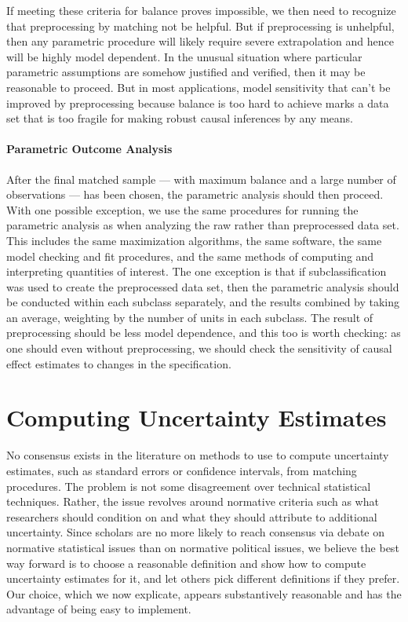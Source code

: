 \documentclass[11pt,titlepage]{article}
\begin{document}
If meeting these criteria for balance proves impossible, we then need
to recognize that preprocessing by matching not be helpful.  But if
preprocessing is unhelpful, then any parametric procedure will likely
require severe extrapolation and hence will be highly model dependent.
In the unusual situation where particular parametric assumptions are
somehow justified and verified, then it may be reasonable to proceed.
But in most applications, model sensitivity that can't be improved by
preprocessing because balance is too hard to achieve marks a data set
that is too fragile for making robust causal inferences by any means.

\paragraph{Parametric Outcome Analysis}  
After the final matched sample --- with maximum balance and a large
number of observations --- has been chosen, the parametric analysis
should then proceed.  With one possible exception, we use the same
procedures for running the parametric analysis as when analyzing the
raw rather than preprocessed data set.  This includes the same
maximization algorithms, the same software, the same model checking
and fit procedures, and the same methods of computing and interpreting
quantities of interest.  The one exception is that if
subclassification was used to create the preprocessed data set, then
the parametric analysis should be conducted within each subclass
separately, and the results combined by taking an average, weighting
by the number of units in each subclass.  The result of preprocessing
should be less model dependence, and this too is worth checking: as
one should even without preprocessing, we should check the sensitivity of causal
effect estimates to changes in the specification.

\section{Computing Uncertainty Estimates}

No consensus exists in the literature on methods to use to compute
uncertainty estimates, such as standard errors or confidence
intervals, from matching procedures.  The problem is not some
disagreement over technical statistical techniques.  Rather, the issue
revolves around normative criteria such as what researchers should
condition on and what they should attribute to additional uncertainty.
Since scholars are no more likely to reach consensus via debate on
normative statistical issues than on normative political issues, we
believe the best way forward is to choose a reasonable definition and
show how to compute uncertainty estimates for it, and let others pick
different definitions if they prefer.  Our choice, which we now
explicate, appears substantively reasonable and has the advantage of
being easy to implement.
\end{document}
